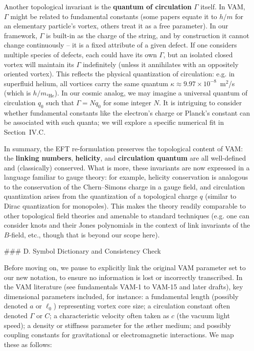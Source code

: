\documentclass[12pt]{article}
\begin{document}
Another topological invariant is the \textbf{quantum of circulation} $\Gamma$ itself. In VAM, $\Gamma$ might be related to fundamental constants (some papers equate it to $h/m$ for an elementary particle’s vortex, others treat it as a free parameter). In our framework, $\Gamma$ is built-in as the charge of the string, and by construction it cannot change continuously – it is a fixed attribute of a given defect. If one considers multiple species of defects, each could have its own $\Gamma$, but an isolated closed vortex will maintain its $\Gamma$ indefinitely (unless it annihilates with an oppositely oriented vortex). This reflects the physical quantization of circulation: e.g. in superfluid helium, all vortices carry the same quantum $\kappa \approx 9.97\times10^{-8}$ m$^2$/s (which is $h/m_{^4\mathrm{He}}$). In our cosmic analog, we may imagine a universal quantum of circulation $q_0$ such that $\Gamma = N q_0$ for some integer $N$. It is intriguing to consider whether fundamental constants like the electron’s charge or Planck’s constant can be associated with such quanta; we will explore a specific numerical fit in Section IV.C.

In summary, the EFT re-formulation preserves the topological content of VAM: the \textbf{linking numbers}, \textbf{helicity}, and \textbf{circulation quantum} are all well-defined and (classically) conserved. What is more, these invariants are now expressed in a language familiar to gauge theory: for example, helicity conservation is analogous to the conservation of the Chern–Simons charge in a gauge field, and circulation quantization arises from the quantization of a topological charge $q$ (similar to Dirac quantization for monopoles). This makes the theory readily comparable to other topological field theories and amenable to standard techniques (e.g. one can consider knots and their Jones polynomials in the context of link invariants of the $B$-field, etc., though that is beyond our scope here).

### D. Symbol Dictionary and Consistency Check

Before moving on, we pause to explicitly link the original VAM parameter set to our new notation, to ensure no information is lost or incorrectly transcribed. In the VAM literature (see fundamentals VAM-1 to VAM-15 and later drafts), key dimensional parameters included, for instance: a fundamental length (possibly denoted $a$ or $\ell_0$) representing vortex core size; a circulation constant often denoted $\Gamma$ or $C$; a characteristic velocity often taken as $c$ (the vacuum light speed); a density or stiffness parameter for the æther medium; and possibly coupling constants for gravitational or electromagnetic interactions. We map these as follows: 
\end{document}
